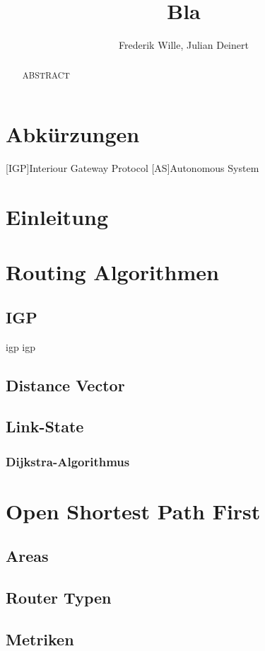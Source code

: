 \documentclass[1pt,a4paper,final]{article}
\title{\LARGE \bf
Bla
}
\author{Frederik Wille, Julian Deinert}
\date{}
\begin{document}

\maketitle
\thispagestyle{empty}
\newpage
\thispagestyle{empty}
\tableofcontents
\newpage
\setcounter{page}{1}

\section*{Abkürzungen}
\begin{acronym}
		[IGP]{Interiour Gateway Protocol}
		[AS]{Autonomous System}
\end{acronym}
\newpage
\begin{abstract}
ABSTRACT

\end{abstract}

\section{Einleitung}
\section{Routing Algorithmen}
\subsection{IGP}
\ac{igp} \ac{igp}
\subsection{Distance Vector}
\subsection{Link-State}
\subsubsection{Dijkstra-Algorithmus}
\section{Open Shortest Path First}
\subsection{Areas}
\subsection{Router Typen}
\subsection{Metriken}
\end{document}
